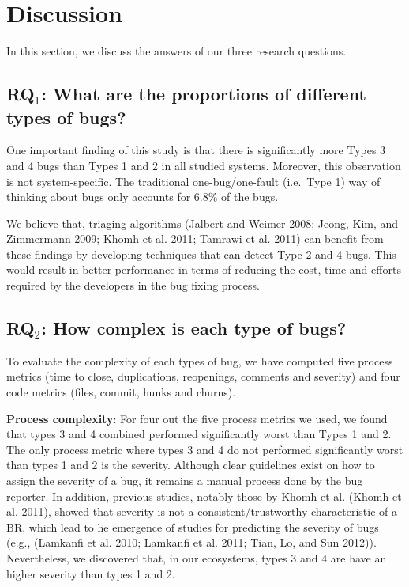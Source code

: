 \documentclass[natbib]{svjour3}
\begin{document}
\section{Discussion}\label{discussion}

In this section, we discuss the answers of our three research questions.

\subsection{\texorpdfstring{RQ\(_1\): What are the proportions of
different types of
bugs?}{RQ\_1: What are the proportions of different types of bugs?}}\label{rqux5f1-what-are-the-proportions-of-different-types-of-bugs}

One important finding of this study is that there is significantly more
Types 3 and 4 bugs than Types 1 and 2 in all studied systems. Moreover,
this observation is not system-specific. The traditional
one-bug/one-fault (i.e.~Type 1) way of thinking about bugs only accounts
for 6.8\% of the bugs.

We believe that, triaging algorithms (Jalbert and Weimer 2008; Jeong,
Kim, and Zimmermann 2009; Khomh et al. 2011; Tamrawi et al. 2011) can
benefit from these findings by developing techniques that can detect
Type 2 and 4 bugs. This would result in better performance in terms of
reducing the cost, time and efforts required by the developers in the
bug fixing process.

\subsection{\texorpdfstring{RQ\(_2\): How complex is each type of
bugs?}{RQ\_2: How complex is each type of bugs?}}\label{rqux5f2-how-complex-is-each-type-of-bugs}

To evaluate the complexity of each types of bug, we have computed five
process metrics (time to close, duplications, reopenings, comments and
severity) and four code metrics (files, commit, hunks and churns).

\textbf{Process complexity}: For four out the five process metrics we
used, we found that types 3 and 4 combined performed significantly worst
than Types 1 and 2. The only process metric where types 3 and 4 do not
performed significantly worst than types 1 and 2 is the severity.
Although clear guidelines exist on how to assign the severity of a bug,
it remains a manual process done by the bug reporter. In addition,
previous studies, notably those by Khomh et al. (Khomh et al. 2011),
showed that severity is not a consistent/trustworthy characteristic of a
BR, which lead to he emergence of studies for predicting the severity of
bugs (e.g., (Lamkanfi et al. 2010; Lamkanfi et al. 2011; Tian, Lo, and
Sun 2012)). Nevertheless, we discovered that, in our ecosystems, types 3
and 4 are have an higher severity than types 1 and 2.
\end{document}
